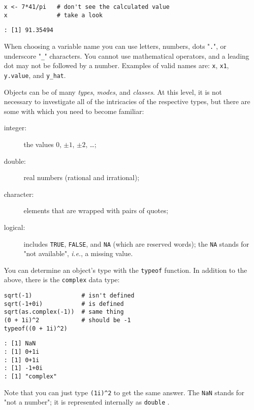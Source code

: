 \begin{Verbatim}
x <- 7*41/pi   # don't see the calculated value
x              # take a look
\end{Verbatim}

\begin{verbatim}
: [1] 91.35494
\end{verbatim}

When choosing a variable name you can use letters, numbers, dots
"\texttt{.}", or underscore "\texttt{\_}" characters. You cannot
use mathematical operators, and a leading dot may not be followed by a
number. Examples of valid names are: \texttt{x}, \texttt{x1}, \texttt{y.value}, and
\texttt{y\_hat}.

Objects can be of many \emph{types}, \emph{modes}, and \emph{classes}. At this level,
it is not necessary to investigate all of the intricacies of the
respective types, but there are some with which you need to become
familiar:
\begin{description}
\item[{integer:}] the values \(0\), \(\pm1\), \(\pm2\), \ldots{};
\item[{double:}] real numbers (rational and irrational);
\item[{character:}] elements that are wrapped with pairs of quotes;
\item[{logical:}] includes \texttt{TRUE}, \texttt{FALSE}, and \texttt{NA} (which are reserved
words); the \texttt{NA}  stands
for "not available", \emph{i.e.}, a missing value.
\end{description}

You can determine an object's type with the \texttt{typeof}
 function. In addition to the above,
there is the \texttt{complex} 
 data type:

\begin{Verbatim}
sqrt(-1)              # isn't defined
sqrt(-1+0i)           # is defined
sqrt(as.complex(-1))  # same thing
(0 + 1i)^2            # should be -1
typeof((0 + 1i)^2)
\end{Verbatim}

\begin{verbatim}
: [1] NaN
: [1] 0+1i
: [1] 0+1i
: [1] -1+0i
: [1] "complex"
\end{verbatim}

Note that you can just type \texttt{(1i)\textasciicircum{}2} to get the same answer. The
\texttt{NaN}  stands for "not a number"; it is
represented internally as \texttt{double} .

